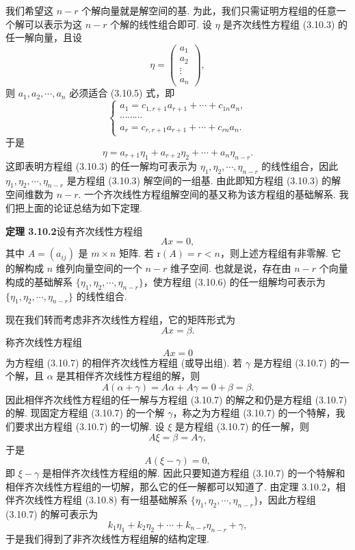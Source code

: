 \documentclass[UTF8,12pt,a4paper,fontset=fandol]{ctexart}
\begin{document}
我们希望这 $n-r$ 个解向量就是解空间的基. 为此，我们只需证明方程组的任意一个解可以表示为这 $n-r$ 个解的线性组合即可. 设 $\eta$ 是齐次线性方程组 (3.10.3) 的任一解向量，且设
\[
\eta=\left(\begin{array}{c}
a_1\\
a_2\\
\vdots\\
a_n
\end{array}\right),
\]
则 $a_1,a_2,\cdots,a_n$ 必须适合 (3.10.5) 式，即
\[
\left\{\begin{array}{c}
a_1=c_{1,r+1}a_{r+1}+\cdots+c_{1n}a_n,\\
\cdots\cdots\cdots\\
a_r=c_{r,r+1}a_{r+1}+\cdots+c_{rn}a_n.
\end{array}\right.
\]
于是
\[
\eta=a_{r+1}\eta_1+a_{r+2}\eta_2+\cdots+a_n\eta_{n-r}.
\]
这即表明方程组 (3.10.3) 的任一解均可表示为 $\eta_1,\eta_2,\cdots,\eta_{n-r}$ 的线性组合，因此 $\eta_1,\eta_2,\cdots,\eta_{n-r}$ 是方程组 (3.10.3) 解空间的一组基. 由此即知方程组 (3.10.3) 的解空间维数为 $n-r$. 一个齐次线性方程组解空间的基又称为该方程组的基础解系. 我们把上面的论证总结为如下定理.

\noindent\textbf{定理 3.10.2}\quad 设有齐次线性方程组
\begin{equation}
Ax=0,
\tag{3.10.6}
\end{equation}
其中 $A=(a_{ij})$ 是 $m\times n$ 矩阵. 若 $\mathrm{r}(A)=r<n$，则上述方程组有非零解. 它的解构成 $n$ 维列向量空间的一个 $n-r$ 维子空间. 也就是说，存在由 $n-r$ 个向量构成的基础解系 $\{\eta_1,\eta_2,\cdots,\eta_{n-r}\}$，使方程组 (3.10.6) 的任一组解均可表示为 $\{\eta_1,\eta_2,\cdots,\eta_{n-r}\}$ 的线性组合.

现在我们转而考虑非齐次线性方程组，它的矩阵形式为
\begin{equation}
Ax=\beta.
\tag{3.10.7}
\end{equation}
称齐次线性方程组
\begin{equation}
Ax=0
\tag{3.10.8}
\end{equation}
为方程组 (3.10.7) 的相伴齐次线性方程组 (或导出组). 若 $\gamma$ 是方程组 (3.10.7) 的一个解，且 $\alpha$ 是其相伴齐次线性方程组的解，则
\[
A(\alpha+\gamma)=A\alpha+A\gamma=0+\beta=\beta.
\]
因此相伴齐次线性方程组的任一解与方程组 (3.10.7) 的解之和仍是方程组 (3.10.7) 的解. 现固定方程组 (3.10.7) 的一个解 $\gamma$，称之为方程组 (3.10.7) 的一个特解，我们要求出方程组 (3.10.7) 的一切解. 设 $\xi$ 是方程组 (3.10.7) 的任一解，则
\[
A\xi=\beta=A\gamma,
\]
于是
\[
A(\xi-\gamma)=0,
\]
即 $\xi-\gamma$ 是相伴齐次线性方程组的解. 因此只要知道方程组 (3.10.7) 的一个特解和相伴齐次线性方程组的一切解，那么它的任一解都可以知道了. 由定理 3.10.2，相伴齐次线性方程组 (3.10.8) 有一组基础解系 $\{\eta_1,\eta_2,\cdots,\eta_{n-r}\}$，因此方程组 (3.10.7) 的解可表示为
\[
k_1\eta_1+k_2\eta_2+\cdots+k_{n-r}\eta_{n-r}+\gamma,
\]
于是我们得到了非齐次线性方程组解的结构定理.
\end{document}
